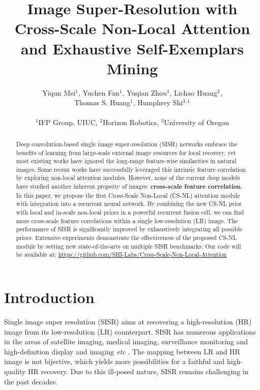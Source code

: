 \documentclass[10pt,twocolumn,letterpaper]{article}
\begin{document}
\title{Image Super-Resolution with Cross-Scale Non-Local Attention \\ and Exhaustive Self-Exemplars Mining}

\author{Yiqun Mei$^{1}$, Yuchen Fan$^{1}$, Yuqian Zhou$^{1}$, Lichao Huang$^{2}$, \\
Thomas S. Huang$^{1}$, Humphrey Shi$^{3,1}$\\
\\
{\small $^1$IFP Group, UIUC, $^2$Horizon Robotics, $^3$University of Oregon}}



\maketitle
\thispagestyle{empty}

\begin{abstract}
Deep convolution-based single image super-resolution (SISR) networks embrace the benefits of learning from large-scale external image resources for local recovery, yet most existing works have ignored the long-range feature-wise similarities in natural images. Some recent works have successfully leveraged this intrinsic feature correlation by exploring non-local attention modules. However, none of the current deep models have studied another inherent property of images: \textbf{cross-scale feature correlation}. In this paper, we propose the first Cross-Scale Non-Local (CS-NL) attention module with integration into a recurrent neural network. By combining the new CS-NL prior with local and in-scale non-local priors in a powerful recurrent fusion cell, we can find more cross-scale feature correlations within a single low-resolution (LR) image. The performance of SISR is significantly improved by exhaustively integrating all possible priors. Extensive experiments demonstrate the effectiveness of the proposed CS-NL module by setting new state-of-the-arts on multiple SISR benchmarks. Our code will be available at: \href{https://github.com/SHI-Labs/Cross-Scale-Non-Local-Attention}{https://github.com/SHI-Labs/Cross-Scale-Non-Local-Attention}
\end{abstract}
 
\section{Introduction}
Single image super resolution (SISR) aims at recovering a high-resolution (HR) image from its low-resolution (LR) counterpart. SISR has numerous applications in the areas of satellite imaging, medical imaging, surveillance monitoring and high-definition display and imaging \textit{etc} \cite{demirel2011discrete, yu2017computed,zhou2018survey,zhou2020image,zou2011very}. The mapping between LR and HR image is not bijective, which yields more possibilities for a faithful and high-quality HR recovery. Due to this ill-posed nature, SISR remains challenging in the past decades. 
\end{document}
